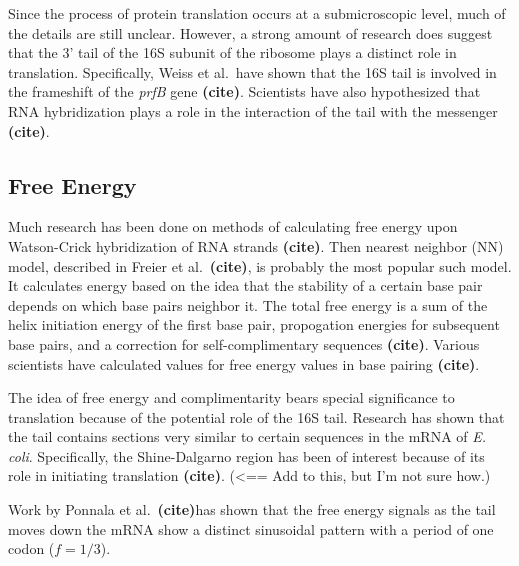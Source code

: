 \documentclass[12pt,titlepage]{article}
\providecommand{\hj}{\textbf{(cite)}}
\numberwithin{equation}{section}
\begin{document}
Since the process of protein translation occurs at a submicroscopic level, much of the details are still unclear.  However, a strong amount of research does suggest that the 3' tail of the 16S subunit of the ribosome plays a distinct role in translation.  Specifically, Weiss et al.\ have shown that the 16S tail is involved in the frameshift of the {\emph{prfB}} gene \hj.  Scientists have also hypothesized that RNA hybridization plays a role in the interaction of the tail with the messenger \hj.

\subsection{Free Energy}
\label{sec:freeenergy}

Much research has been done on methods of calculating free energy upon Watson-Crick hybridization of RNA strands \hj.  Then nearest neighbor (NN) model, described in Freier et al.\ \hj, is probably the most popular such model.  It calculates energy based on the idea that the stability of a certain base pair depends on which base pairs neighbor it.  The total free energy is a sum of the helix initiation energy of the first base pair, propogation energies for subsequent base pairs, and a correction for self-complimentary sequences \hj.  Various scientists have calculated values for free energy values in base pairing \hj.

The idea of free energy and complimentarity bears special significance to translation because of the potential role of the 16S tail.  Research has shown that the tail contains sections very similar to certain sequences in the mRNA of \emph{E. coli}.  Specifically, the Shine-Dalgarno region has been of interest because of its role in initiating translation \hj. (<== Add to this, but I'm not sure how.)

Work by Ponnala et al.\ \hj has shown that the free energy signals as the tail moves down the mRNA show a distinct sinusoidal pattern with a period of one codon ($f = 1/3$).
\end{document}
